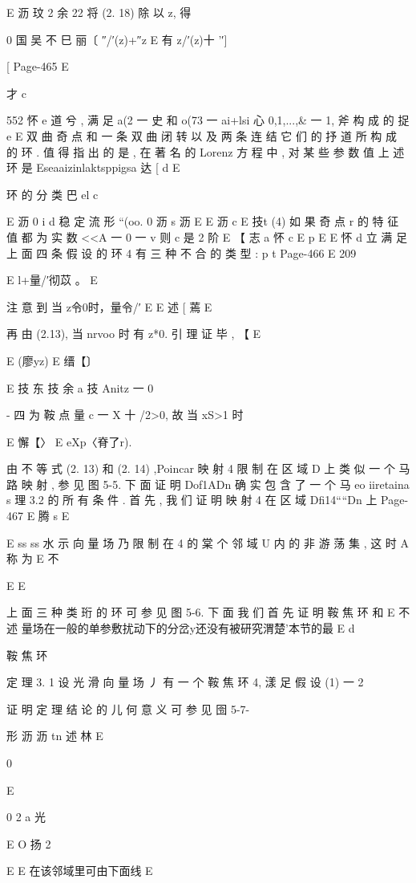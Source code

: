 {{{{E 沥 玟 2 余 22
将 (2. 18) 除 以 z, 得

0 国 吴 不 巳
丽〔 ″/′(z)+″z E 有 z/′(z)十 '′]

[
Page-465
E

才 c

552 怀 e
道 兮 , 满 足 a(2 一 史 和 o(73 一 ai+lsi 心 0,1,...,& 一 1, 斧 构 成 的 捉
e
E
双 曲 奇 点 和 一 条 双 曲 闭 转 以 及 两 条 连 结 它 们 的 抒 道 所 构 成 的 环 .
值 得 指 出 的 是 , 在 著 名 的 Lorenz 方 程 中 , 对 某 些 参 数 值 上 述 环 是
Eseaaizinlaktsppigsa 达 [ d
E

环 的 分 类
巴 el c

E 沥
0 i d
稳 定 流 形 “(oo.
0 沥 s 沥
E
E 沥 c
E 技t
(4) 如 果 奇 点 r 的 特 征 值 都 为 实 数 <<A 一 0 一 v 则 c 是 2 阶
E
【 志 a 怀 c
E p
E
E 怀 d 立
满 足 上 面 四 条 假 设 的 环 4 有 三 种 不 合 的 类 型 :
p t
Page-466
E 209

E l+量/′彻苡 。 E

注 意 到 当 z令0时，量令/′ E
E 述 [
蔫 E

再 由 (2.13), 当 nrvoo 时 有 z*0. 引 理 证 毕 , 【
E

E {(廖yz) E 缙【〕 }

E 技 东 技 余 a 技
Anitz 一 0}- 四 为 鞍 点 量 c 一 X 十 /2>0, 故 当 xS>1 时

E 懈【〉 E eXp〈脊了r).

由 不 等 式 (2. 13) 和 (2. 14) ,Poincar 映 射 4 限 制 在 区 域 D 上 类 似
一 个 马 路 映 射 , 参 见 图 5-5. 下 面 证 明 Dof1ADn 确 实 包 含 了 一 个 马
eo iiretaina s
理 3.2 的 所 有 条 件 . 首 先 , 我 们 证 明 映 射 4 在 区 域 Dfi14““Dn 上
Page-467
E 腾 s E

E ss ss 水
示 向 量 场 乃 限 制 在 4 的 棠 个 邻 域 U 内 的 非 游 荡 集 , 这 时 A 称 为
E 不

E
E

上 面 三 种 类 珩 的 环 可 参 见 图 5-6. 下 面 我 们 首 先 证 明 鞍 焦 环 和
E 不 述
量场在一般的单参敷扰动下的分岔y还没有被研究渭楚'本节的最
E d

鞍 焦 环

定 理 3. 1 设 光 滑 向 量 场 丿 有 一 个 鞍 焦 环 4, 漾 足 假 设 (1) 一
2

证 明 定 理 结 论 的 儿 何 意 义 可 参 见 囹 5-7-

形 沥 沥 tn 述 林
E

0

E

0 2 a 光

E O 扬 2

E
E 在该邻域里可由下面线
E

}}}

